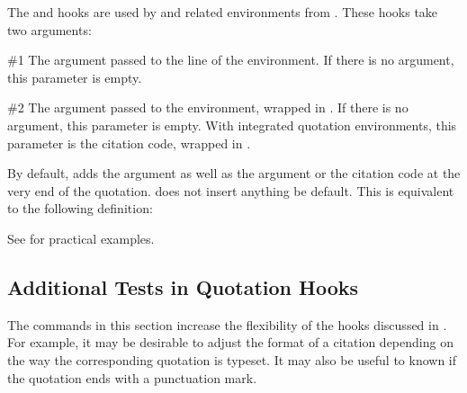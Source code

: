 \documentclass{ltxdockit}[2010/09/26]
\begin{document}
\begin{ltxsyntax}
\begin{ltxcode}
\newcommand{<<\mkblockquote>>}[4]{#1#2#4#3}
\end{ltxcode}


The  and  hooks are used by  and related environments from . These hooks take two arguments:

\begin{argumentlist}{00}
\item[\#1] The  argument passed to the  line of the environment. If there is no  argument, this parameter is empty.
\item[\#2] The  argument passed to the environment, wrapped in . If there is no  argument, this parameter is empty. With integrated quotation environments, this parameter is the citation code, wrapped in .
\end{argumentlist}
%
By default,  adds the  argument as well as the  argument or the citation code at the very end of the quotation.  does not insert anything be default. This is equivalent to the following definition:

\begin{ltxcode}
\newcommand{<<\mkbegdispquote>>}[2]{}
\newcommand{<<\mkenddispquote>>}[2]{#1#2}
\end{ltxcode}
%
See  for practical examples.

\end{ltxsyntax}

\subsection{Additional Tests in Quotation Hooks}
\label{cfg:tst}

The commands in this section increase the flexibility of the hooks discussed in . For example, it may be desirable to adjust the format of a citation depending on the way the corresponding quotation is typeset. It may also be useful to known if the quotation ends with a punctuation mark.
\end{document}
